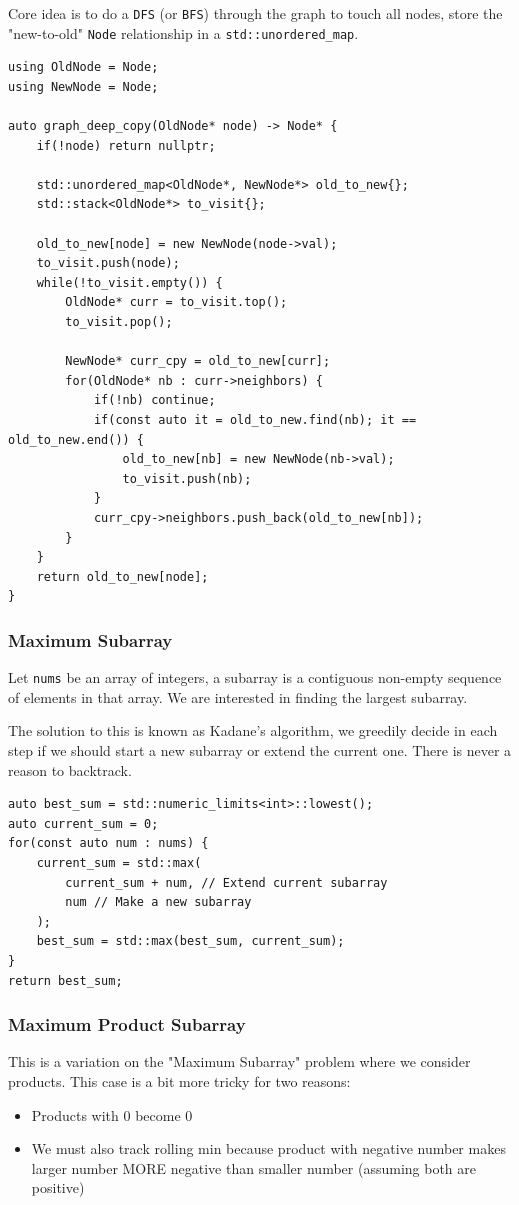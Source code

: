 \documentclass{article}
\begin{document}
Core idea is to do a \texttt{DFS} (or \texttt{BFS}) through the graph to touch all nodes, store the "new-to-old" \texttt{Node} relationship in a \texttt{std::unordered\_map}.
\begin{lstlisting}
using OldNode = Node;
using NewNode = Node;

auto graph_deep_copy(OldNode* node) -> Node* {
    if(!node) return nullptr;

    std::unordered_map<OldNode*, NewNode*> old_to_new{};
    std::stack<OldNode*> to_visit{};

    old_to_new[node] = new NewNode(node->val);
    to_visit.push(node);
    while(!to_visit.empty()) {
        OldNode* curr = to_visit.top();
        to_visit.pop();

        NewNode* curr_cpy = old_to_new[curr];
        for(OldNode* nb : curr->neighbors) {
            if(!nb) continue;
            if(const auto it = old_to_new.find(nb); it == old_to_new.end()) {
                old_to_new[nb] = new NewNode(nb->val);
                to_visit.push(nb);
            }
            curr_cpy->neighbors.push_back(old_to_new[nb]);
        }
    }
    return old_to_new[node];
}
\end{lstlisting}

\subsubsection{Maximum Subarray}
Let \texttt{nums} be an array of integers, a subarray is a contiguous non-empty sequence of elements in that array. We are interested in finding the largest subarray.

The solution to this is known as Kadane's algorithm, we greedily decide in each step if we should start a new subarray or extend the current one. There is never a reason to backtrack.
\begin{lstlisting}
auto best_sum = std::numeric_limits<int>::lowest();
auto current_sum = 0;
for(const auto num : nums) {
    current_sum = std::max(
        current_sum + num, // Extend current subarray
        num // Make a new subarray
    );
    best_sum = std::max(best_sum, current_sum);
}
return best_sum;
\end{lstlisting}

\subsubsection{Maximum Product Subarray}
This is a variation on the "Maximum Subarray" problem where we consider products. This case is a bit more tricky for two reasons:
\begin{itemize}
    \item Products with 0 become 0
    \item We must also track rolling min because product with negative number makes larger number MORE negative than smaller number (assuming both are positive)
\end{itemize}
\end{document}
